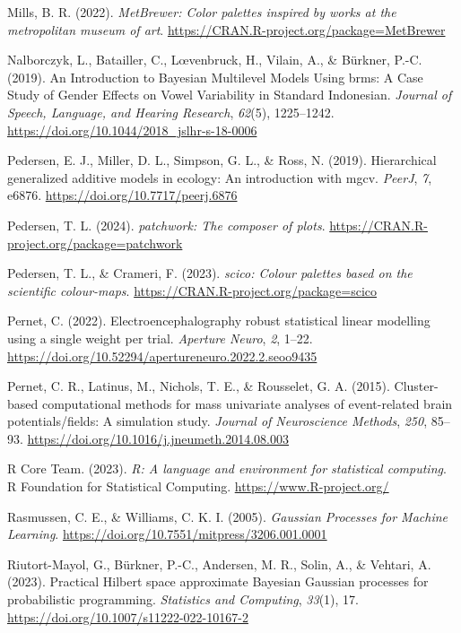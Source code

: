 \documentclass[
  doc,
  floatsintext,
  longtable,
  a4paper,
  nolmodern,
  notxfonts,
  notimes,
  colorlinks=true,linkcolor=blue,citecolor=blue,urlcolor=blue]{apa7}
\newlength{\cslhangindent}
\newenvironment{CSLReferences}[2] %
 {\begin{list}{}{%
  \setlength{\itemindent}{0pt}
  \setlength{\leftmargin}{0pt}
  \setlength{\parsep}{0pt}
  \ifodd #1
   \setlength{\leftmargin}{\cslhangindent}
   \setlength{\itemindent}{-1\cslhangindent}
  \fi
  \setlength{\itemsep}{#2\baselineskip}}}
 {\end{list}}
\begin{document}
\begin{CSLReferences}{1}{0}
Mills, B. R. (2022). \emph{{MetBrewer}: Color palettes inspired by works
at the metropolitan museum of art}.
\url{https://CRAN.R-project.org/package=MetBrewer}

Nalborczyk, L., Batailler, C., Lœvenbruck, H., Vilain, A., \& Bürkner,
P.-C. (2019). An Introduction to Bayesian Multilevel Models Using brms:
A Case Study of Gender Effects on Vowel Variability in Standard
Indonesian. \emph{Journal of Speech, Language, and Hearing Research},
\emph{62}(5), 1225--1242.
\url{https://doi.org/10.1044/2018_jslhr-s-18-0006}

Pedersen, E. J., Miller, D. L., Simpson, G. L., \& Ross, N. (2019).
Hierarchical generalized additive models in ecology: An introduction
with mgcv. \emph{PeerJ}, \emph{7}, e6876.
\url{https://doi.org/10.7717/peerj.6876}

Pedersen, T. L. (2024). \emph{{patchwork}: The composer of plots}.
\url{https://CRAN.R-project.org/package=patchwork}

Pedersen, T. L., \& Crameri, F. (2023). \emph{{scico}: Colour palettes
based on the scientific colour-maps}.
\url{https://CRAN.R-project.org/package=scico}

Pernet, C. (2022). Electroencephalography robust statistical linear
modelling using a single weight per trial. \emph{Aperture Neuro},
\emph{2}, 1--22.
\url{https://doi.org/10.52294/apertureneuro.2022.2.seoo9435}

Pernet, C. R., Latinus, M., Nichols, T. E., \& Rousselet, G. A. (2015).
Cluster-based computational methods for mass univariate analyses of
event-related brain potentials/fields: A simulation study. \emph{Journal
of Neuroscience Methods}, \emph{250}, 85--93.
\url{https://doi.org/10.1016/j.jneumeth.2014.08.003}

R Core Team. (2023). \emph{{R}: A language and environment for
statistical computing}. R Foundation for Statistical Computing.
\url{https://www.R-project.org/}

Rasmussen, C. E., \& Williams, C. K. I. (2005). \emph{Gaussian Processes
for Machine Learning}.
\url{https://doi.org/10.7551/mitpress/3206.001.0001}

Riutort-Mayol, G., Bürkner, P.-C., Andersen, M. R., Solin, A., \&
Vehtari, A. (2023). Practical {Hilbert} space approximate {Bayesian
Gaussian} processes for probabilistic programming. \emph{Statistics and
Computing}, \emph{33}(1), 17.
\url{https://doi.org/10.1007/s11222-022-10167-2}


\end{CSLReferences}
\end{document}
